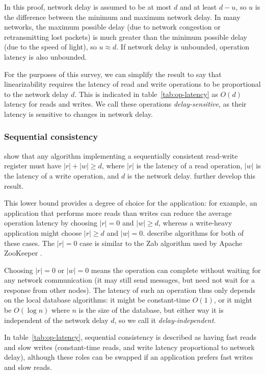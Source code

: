 \documentclass[fleqn,12pt,lineno]{wlpeerj} %
\begin{document}
In this proof, network delay is assumed to be at most $d$ and at least $d-u$, so $u$ is the
difference between the minimum and maximum network delay. In many networks, the maximum possible
delay (due to network congestion or retransmitting lost packets) is much greater than the minimum
possible delay (due to the speed of light), so $u \approx d$. If network delay is unbounded,
operation latency is also unbounded.

For the purposes of this survey, we can simplify the result to say that linearizability requires the
latency of read and write operations to be proportional to the network delay $d$. This is indicated
in table~\ref{tab:op-latency} as $O(d)$ latency for reads and writes. We call these operations
\emph{delay-sensitive}, as their latency is sensitive to changes in network delay.

\subsubsection{Sequential consistency}

\citet{Lipton1988uh} show that any algorithm implementing a sequentially
consistent read-write register must have $|r| + |w| \geq d$, where $|r|$ is the latency of a read
operation, $|w|$ is the latency of a write operation, and $d$ is the network delay.
\citet{Mavronicolas1999eb} further develop this result.

This lower bound provides a degree of choice for the application: for example, an application that
performs more reads than writes can reduce the average operation latency by choosing $|r| = 0$ and
$|w| \geq d$, whereas a write-heavy application might choose $|r| \geq d$ and $|w| = 0$.
\citet{Attiya1994gw} describe algorithms for both of these cases. The $|r| = 0$ case is similar
to the Zab algorithm used by Apache ZooKeeper \citep{Junqueira2011jc}.

Choosing $|r| = 0$ or $|w| = 0$ means the operation can complete without waiting for any network
communication (it may still send messages, but need not wait for a response from other nodes). The
latency of such an operation thus only depends on the local database algorithms: it might be
constant-time $O(1)$, or it might be $O(\log n)$ where $n$ is the size of the database, but either
way it is independent of the network delay $d$, so we call it \emph{delay-independent}.

In table~\ref{tab:op-latency}, sequential consistency is described as having fast reads and slow
writes (constant-time reads, and write latency proportional to network delay), although these roles
can be swapped if an application prefers fast writes and slow reads.
\end{document}
